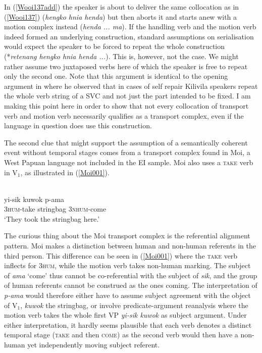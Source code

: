 In (\ref{Wooi137add}) the speaker is about to deliver the same collocation as in (\ref{Wooi137}) (\textit{hengko hnia henda}) but then aborts it and starts anew with a motion complex instead (\textit{henda ... ma}). If the handling verb and the motion verb indeed formed an underlying construction, standard assumptions on serialisation would expect the speaker to be forced to repeat the whole construction (*\textit{retenang hengko hnia henda ...}). This is, however, not the case. We might rather assume two juxtaposed verbs here of which the speaker is free to repeat only the second one. Note that this argument is identical to the opening argument in \citet{senft2008intro} where he observed that in cases of self repair Kilivila speakers repeat the whole verb string of a SVC and not just the part intended to be fixed. I am making this point here in order to show that not every collocation of transport verb and motion verb necessarily qualifies as a transport complex, even if the language in question does use this construction.

The second clue that might support the assumption of a semantically coherent event without temporal stages comes from a transport complex found in Moi, a West Papuan language not included in the EI sample. Moi also uses a \textsc{take} verb in V$_{1}$, as illustrated in (\ref{Moi001}).

\ea \label{Moi001}
\\
\gll yi-sik kuwok p-ama \\
\textsc{3}\textsc{hum}-take stringbag \textsc{3}\textsc{nhum}-come \\
\glft `They took the stringbag here.'\\ 
\z

The curious thing about the Moi transport complex is the referential alignment pattern. Moi makes a distinction between human and non-human referents in the third person. This difference can be seen in (\ref{Moi001}) where the \textsc{take} verb inflects for 3\textsc{hum}, while the motion verb takes non-human marking. The subject of \textit{ama} `come' thus cannot be co-referential with the subject of \textit{sik}, and the group of human referents cannot be construed as the ones coming. The interpretation of \textit{p-ama} would therefore either have to assume subject agreement with the object of V$_{1}$, \textit{kuwok} the stringbag, or involve predicate-argument reanalysis where the motion verb takes the whole first VP \textit{yi-sik kuwok} as subject argument. Under either interpretation, it hardly seems plausible that each verb denotes a distinct temporal stage (\textsc{take} and then \textsc{come}) as the second verb would then have a non-human yet independently moving subject referent.

